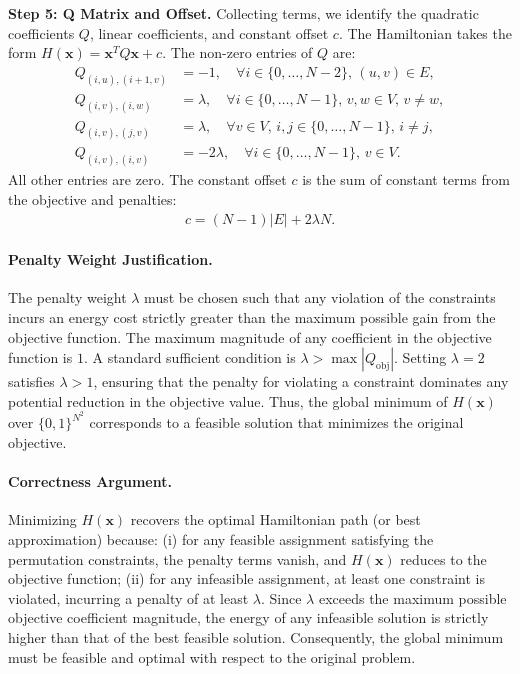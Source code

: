\documentclass[12pt]{article}
\begin{document}
\textbf{Step 5: Q Matrix and Offset.}
Collecting terms, we identify the quadratic coefficients $Q$, linear coefficients, and constant offset $c$. The Hamiltonian takes the form $H(\mathbf{x}) = \mathbf{x}^T Q \mathbf{x} + c$. The non-zero entries of $Q$ are:
\begin{align}
Q_{(i,u),(i+1,v)} &= -1, \quad \forall i \in \{0, \dots, N-2\}, \, (u,v) \in E, \\
Q_{(i,v),(i,w)} &= \lambda, \quad \forall i \in \{0, \dots, N-1\}, \, v, w \in V, \, v \neq w, \\
Q_{(i,v),(j,v)} &= \lambda, \quad \forall v \in V, \, i, j \in \{0, \dots, N-1\}, \, i \neq j, \\
Q_{(i,v),(i,v)} &= -2\lambda, \quad \forall i \in \{0, \dots, N-1\}, \, v \in V.
\end{align}
All other entries are zero. The constant offset $c$ is the sum of constant terms from the objective and penalties:
\begin{align}
c = (N-1)|E| + 2\lambda N.
\end{align}

\paragraph{Penalty Weight Justification.}
The penalty weight $\lambda$ must be chosen such that any violation of the constraints incurs an energy cost strictly greater than the maximum possible gain from the objective function. The maximum magnitude of any coefficient in the objective function is $1$. A standard sufficient condition is $\lambda > \max |Q_{\text{obj}}|$. Setting $\lambda = 2$ satisfies $\lambda > 1$, ensuring that the penalty for violating a constraint dominates any potential reduction in the objective value. Thus, the global minimum of $H(\mathbf{x})$ over $\{0,1\}^{N^2}$ corresponds to a feasible solution that minimizes the original objective.

\paragraph{Correctness Argument.}
Minimizing $H(\mathbf{x})$ recovers the optimal Hamiltonian path (or best approximation) because: (i) for any feasible assignment satisfying the permutation constraints, the penalty terms vanish, and $H(\mathbf{x})$ reduces to the objective function; (ii) for any infeasible assignment, at least one constraint is violated, incurring a penalty of at least $\lambda$. Since $\lambda$ exceeds the maximum possible objective coefficient magnitude, the energy of any infeasible solution is strictly higher than that of the best feasible solution. Consequently, the global minimum must be feasible and optimal with respect to the original problem.
\end{document}
